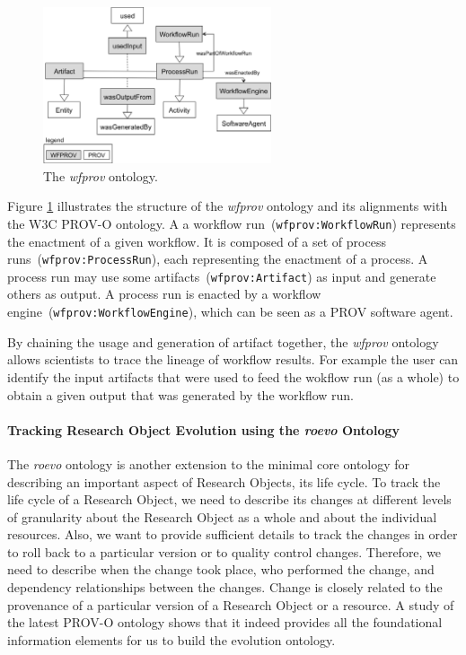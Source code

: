 \begin{figure}[ht]
  \centering
  \includegraphics[width=0.6\textwidth]{Figures/wfprov.png}
  \caption{The \textit{wfprov} ontology.}
  \label{fig:wfprov}
\end{figure}

Figure \ref{fig:wfprov} illustrates the structure of the \textit{wfprov} ontology and its alignments with the W3C PROV-O ontology. A a workflow run~(\texttt{wfprov:WorkflowRun}) represents the enactment of a given workflow. It is composed of a set of process runs~(\texttt{wfprov:ProcessRun}), each representing the enactment of a process. A process run may use some artifacts~(\texttt{wfprov:Artifact}) as input and generate others as output. A process run is enacted by a workflow engine~(\texttt{wfprov:WorkflowEngine}), which can be seen as a PROV software agent.

By chaining the usage and generation of artifact together, the \textit{wfprov} ontology allows scientists to trace the lineage of workflow results. For example the user can identify the input artifacts that were used to feed the wokflow run (as a whole) to obtain a given output that was generated by the workflow run.

\paragraph{Tracking Research Object Evolution using the \textit{roevo} Ontology}
The \textit{roevo} ontology is another extension to the minimal core ontology for describing an important aspect of Research Objects, its life cycle.
To track the life cycle of a Research Object, we need to describe its changes at different levels of granularity about the Research Object as a whole and about the individual resources. Also, we want to provide sufficient details to track the changes in order to roll back to a particular version or to quality control changes. Therefore, we need to describe when the change took place, who performed the change, and dependency relationships between the changes. %
Change is closely related to the provenance of a particular version of a Research Object or a resource. A study of the latest PROV-O ontology shows that it indeed provides all the foundational information elements for us to build the evolution ontology. 

